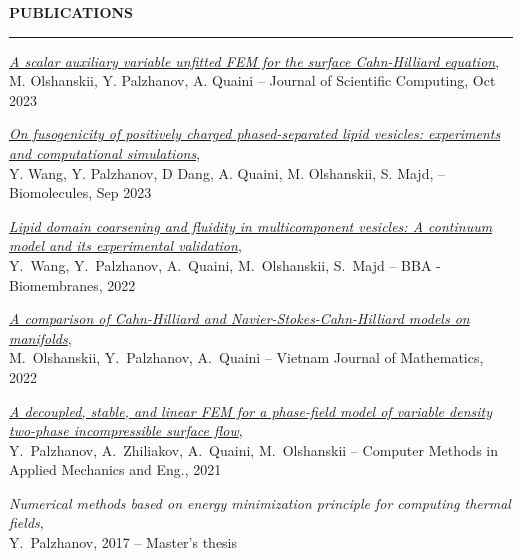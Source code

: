 \documentclass[10pt,letterpaper]{letter}
\newcommand{\gsect}[1]{\textcolor{codepurple}{\textbf{{\Large \uppercase{#1} }}} \\ \hrule}
\begin{document}
\gsect{Publications}
\begin{etaremune}
	\item \textsl{\href{https://doi.org/10.1007/s10915-023-02370-8}{A scalar auxiliary variable unfitted FEM for the surface Cahn-Hilliard equation}},\\ M. Olshanskii, Y. Palzhanov, A. Quaini -- Journal of Scientific Computing, Oct 2023
	\item \textsl{\href{https://doi.org/10.3390/biom13101473}{On fusogenicity of positively charged phased-separated lipid vesicles: experiments and computational simulations}},\\ Y. Wang, Y. Palzhanov, D Dang, A. Quaini, M. Olshanskii, S. Majd, -- Biomolecules, Sep 2023
	\item \textsl{\href{https://doi.org/10.1016/j.bbamem.2022.183898}{Lipid domain coarsening and fluidity in multicomponent vesicles: A continuum model and its experimental validation}},\\ Y.~Wang, Y.~Palzhanov, A.~Quaini, M.~Olshanskii, S.~Majd -- BBA - Biomembranes, 2022	
	\item \textsl{\href{https://link.springer.com/article/10.1007/s10013-022-00564-5}{A comparison of Cahn-Hilliard and Navier-Stokes-Cahn-Hilliard models on manifolds}},\\ M.~Olshanskii, Y.~Palzhanov, A.~Quaini -- Vietnam Journal of Mathematics, 2022	
	\item \textsl{\href{https://www.sciencedirect.com/science/article/abs/pii/S0045782521004989}{A decoupled, stable, and linear FEM for a phase-field model of variable density two-phase incompressible surface flow}},\\ Y.~Palzhanov, A.~Zhiliakov, A.~Quaini, M.~Olshanskii -- 
	Computer Methods in Applied Mechanics and Eng., 2021
	\item \textsl{Numerical methods based on energy minimization principle for computing thermal fields},\\ Y.~Palzhanov, 2017 -- Master's thesis
\end{etaremune}

\end{document}
